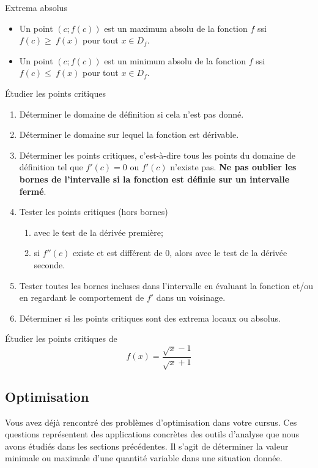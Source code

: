 \documentclass[a4paper,12pt]{article}
\begin{document}
\begin{definition}
	Extrema absolus
\tcblower
\begin{itemize}
	\item 	Un point $(c;f(c))$ est un maximum absolu de la fonction $f$ ssi $f(c)\geq~f(x)$ pour tout $x\in D_f$. 
\item Un point $(c;f(c))$ est un minimum absolu de la fonction $f$ ssi $f(c)\leq~f(x)$ pour tout $x\in D_f$. 
\end{itemize}
\end{definition}
\begin{methode}[label=met:ptcrit]
	Étudier les points critiques
	\tcblower
	\begin{enumerate}
		\item Déterminer le domaine de définition si cela n'est pas donné.
		\item Déterminer le domaine sur lequel la fonction est dérivable. 
		\item Déterminer les points critiques, c'est-à-dire tous les points du domaine de définition tel que $f'(c)=0$ ou $f'(c)$ n'existe pas. {\bfseries Ne pas oublier les bornes de l'intervalle si la fonction est définie sur un intervalle fermé}. 
		\item Tester les points critiques (hors bornes) 
			\begin{enumerate}
				\item avec le test de la dérivée première;
				\item si $f''(c)$ existe et est différent de $0$, alors avec le test de la dérivée seconde.
			\end{enumerate}
		\item Tester toutes les bornes incluses dans l'intervalle en évaluant la fonction et/ou en regardant le comportement de $f'$ dans un voisinage.
		\item Déterminer si les points critiques sont des extrema locaux ou absolus.
	\end{enumerate}
\end{methode}
\begin{activite}
	\tcblower
	Étudier les points critiques de 
	\[f(x)=\dfrac{\sqrt{x}-1}{\sqrt{x}+1}\]
\end{activite}
\subsection{Optimisation}
Vous avez déjà rencontré des problèmes d'optimisation dans votre cursus. Ces questions représentent des applications concrètes des outils d'analyse que nous avons étudiés dans les sections précédentes. Il s'agit de déterminer la valeur minimale ou maximale d'une quantité variable dans une situation donnée. 
\end{document}
